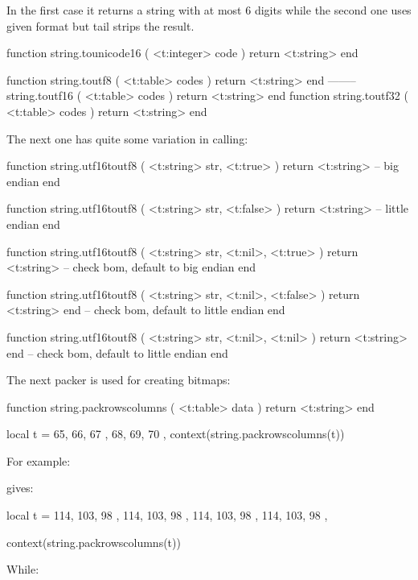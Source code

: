 In the first case it returns a string with at most 6 digits while the second one
uses given format but tail strips the result.

\starttyping[option=LUA]
function string.tounicode16 ( <t:integer> code  ) return <t:string> end
\stoptyping

\starttyping[option=LUA]
function string.toutf8  ( <t:table>   codes ) return <t:string> end
-------- string.toutf16 ( <t:table>   codes ) return <t:string> end
function string.toutf32 ( <t:table>   codes ) return <t:string> end
\stoptyping

The next one has quite some variation in calling:

\starttyping[option=LUA]
function string.utf16toutf8 ( <t:string> str, <t:true> )
    return <t:string>  -- big endian
end
\stoptyping

\starttyping[option=LUA]
function string.utf16toutf8 ( <t:string> str, <t:false> )
    return <t:string> -- little endian
end
\stoptyping

\starttyping[option=LUA]
function string.utf16toutf8 ( <t:string> str, <t:nil>, <t:true> )
    return <t:string> -- check bom, default to big endian
end
\stoptyping

\starttyping[option=LUA]
function string.utf16toutf8 ( <t:string> str, <t:nil>, <t:false> )
    return <t:string> end -- check bom, default to little endian
end
\stoptyping

\starttyping[option=LUA]
function string.utf16toutf8 ( <t:string> str, <t:nil>, <t:nil> )
    return <t:string> end -- check bom, default to little endian
end
\stoptyping

The next packer is used for creating bitmaps:

\starttyping[option=LUA]
function string.packrowscolumns ( <t:table> data )
    return <t:string>
end
\stoptyping

\startbuffer
\startluacode
local t = {
    { 65, 66, 67 },
    { 68, 69, 70 },
}
context(string.packrowscolumns(t))
\stopluacode
\stopbuffer

For example:

\typebuffer

gives: \inlinebuffer

\startbuffer
\startluacode
local t = {
    { { 114, 103, 98 }, { 114, 103, 98 } },
    { { 114, 103, 98 }, { 114, 103, 98 } },
}

context(string.packrowscolumns(t))
\stopluacode
\stopbuffer

While:

\typebuffer

